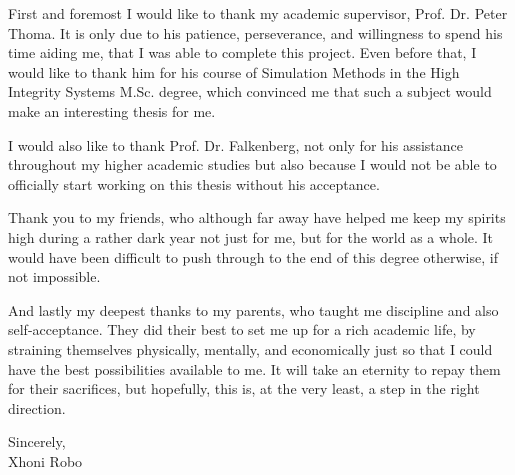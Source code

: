 \documentclass[
12pt, %
oneside, %
english, %
doublespacing, %
parskip, %
headsepline, %
chapterinoneline, %
]{MastersDoctoralThesis} %
\begin{document}
\begin{acknowledgements}
\addchaptertocentry{\acknowledgementname} %
First and foremost I would like to thank my academic supervisor, Prof. Dr. Peter Thoma. It is only due to his patience, perseverance, and willingness to spend his time aiding me, that I was able to complete this project. Even before that, I would like to thank him for his course of Simulation Methods in the High Integrity Systems M.Sc. degree, which convinced me that such a subject would make an interesting thesis for me.

I would also like to thank Prof. Dr. Falkenberg, not only for his assistance throughout my higher academic studies but also because I would not be able to officially start working on this thesis without his acceptance.

Thank you to my friends, who although far away have helped me keep my spirits high during a rather dark year not just for me, but for the world as a whole. It would have been difficult to push through to the end of this degree otherwise, if not impossible.

And lastly my deepest thanks to my parents, who taught me discipline and also self-acceptance. They did their best to set me up for a rich academic life, by straining themselves physically, mentally, and economically just so that I could have the best possibilities available to me. It will take an eternity to repay them for their sacrifices, but hopefully, this is, at the very least, a step in the right direction.

Sincerely,\\
Xhoni Robo
\end{acknowledgements}


\small
\tableofcontents %
\normalsize

\listoffigures %

\end{document}
